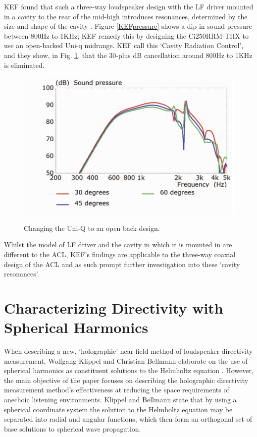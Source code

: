 \documentclass{report}
\begin{document}
        KEF found that such a three-way loudspeaker design with the LF driver mounted in a cavity to the rear of the mid-high introduces resonances, determined by the size and shape of the cavity \cite{KEFCi}.
        Figure \ref{KEFpressure} shows a dip in sound pressure between 800Hz to 1KHz; KEF remedy this by designing the Ci250RRM-THX to use an open-backed Uni-q midrange.
        KEF call this `Cavity Radiation Control', and they show, in Fig. \ref{KEFopenback}, that the 30-plus dB cancellation around 800Hz to 1KHz is eliminated.

        \begin{figure}[H]
            \centering
            \includegraphics[scale=0.8]{figs/KEFopenback.png}
            \caption{Changing the Uni-Q to an open back design.}\cite{KEFCi}
            \label{KEFopenback}
        \end{figure}

        Whilst the model of LF driver and the cavity in which it is mounted in are different to the ACL, KEF's findings are applicable to the three-way coaxial design of the ACL and as such prompt further investigation into these `cavity resonances'.
        \newpage
    \section{Characterizing Directivity with Spherical Harmonics} 
        When describing a new, `holographic' near-field method of loudspeaker directivity measurement, Wolfgang Klippel and Christian Bellmann elaborate on the use of spherical harmonics as constituent solutions to the Helmholtz equation \cite{klippel2016holographic}.
        However, the main objective of the paper focuses on describing the holographic directivity measurement method's effectiveness at reducing the space requirements of anechoic listening environments.
        Klippel and Bellmann state that by using a spherical coordinate system the solution to the Helmholtz equation may be separated into radial and angular functions, which then form an orthogonal set of base solutions to spherical wave propagation.
\end{document}
